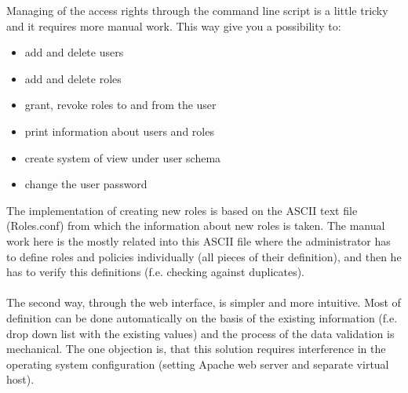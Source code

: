Managing of the access rights through the command line script is a little tricky and it requires more manual work. This way give you a possibility to:
\begin{itemize}
\item add and delete users
\item add and delete roles 
\item grant, revoke roles to and from the user
\item print information about users and roles
\item create system of view under user schema
\item change the user password
\end{itemize} 
The implementation of creating new roles is based on the ASCII text file (Roles.conf) from which the information about new roles is taken. The manual work here is the mostly related into this ASCII file where the administrator has to define roles and policies individually (all pieces of their definition), and then he has to verify this definitions (f.e. checking against duplicates).\\
\\
The second way, through the web interface, is simpler and more intuitive. Most of definition can be done automatically on the basis of the existing information (f.e. drop down list with the existing values) and the process of the data validation is mechanical. The one objection is, that this solution requires interference in the operating system configuration (setting Apache web server and separate virtual host).

